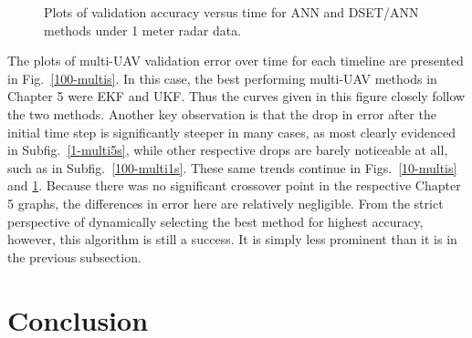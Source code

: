 \documentclass[12pt]{uthesis-v12}  %
\begin{document}
\begin{figure}
	\hfill	
{}
						
\caption{Plots of validation accuracy versus time for ANN and DSET/ANN methods under 1 meter radar data.}
	\label{1-multis}
	\end{figure}	
	
The plots of multi-UAV validation error over time for each timeline are presented in Fig.~\ref{100-multis}. In this case, the best performing multi-UAV methods in Chapter 5 were EKF and UKF. Thus the curves given in this figure closely follow the two methods. Another key observation is that the drop in error after the initial time step is significantly steeper in many cases, as most clearly evidenced in Subfig.~\ref{1-multi5s}, while other respective drops are barely noticeable at all, such as in Subfig.~\ref{100-multi1s}. These same trends continue in Figs.~\ref{10-multis} and \ref{1-multis}. Because there was no significant crossover point in the respective Chapter 5 graphs, the differences in error here are relatively negligible. From the strict perspective of dynamically selecting the best method for highest accuracy, however, this algorithm is still a success. It is simply less prominent than it is in the previous subsection.


\section{Conclusion}
\end{document}

